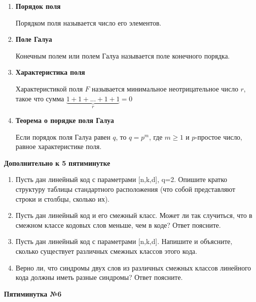 \documentclass[a4paper, 12pt]{report}
\begin{document}
\begin{enumerate}
\item \textbf{Порядок поля}

Порядком поля называется число его элементов.\\

\item \textbf{Поле Галуа}

Конечным полем или полем Галуа называется поле конечного порядка.

\item \textbf{Характеристика поля}

Характеристикой поля $F$ называется минимальное неотрицательное число $r$, такое что сумма $\underbrace{1+1+...+1+1}_{r} = 0$

\item \textbf{Теорема о порядке поля Галуа}

Если порядок поля Галуа равен $q$, то $q = p^{m}$, где $m\geq 1$ и $p$-простое число, равное характеристике поля.

\end{enumerate}




\textbf{Дополнительно к 5 пятиминутке}

\begin{enumerate}

\item Пусть дан линейный код с параметрами [n,k,d], q=2. Опишите кратко структуру таблицы стандартного расположения (что собой представляют строки и столбцы, сколько их).

\item Пусть дан линейный код и его смежный класс. Может ли так случиться, что в смежном классе кодовых слов меньше, чем в коде? Ответ поясните.

\item Пусть дан линейный код с параметрами [n,k,d]. Напишите и объясните, сколько существует различных смежных классов этого кода.

\item Верно ли, что синдромы двух слов из различных смежных классов линейного кода должны иметь разные синдромы? Ответ поясните.

\end{enumerate}


\textbf{Пятиминутка №6}
\end{document}
